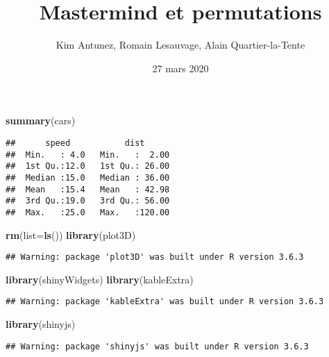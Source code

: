 \documentclass[]{article}
\title{Mastermind et permutations}
\author{Kim Antunez, Romain Lesauvage, Alain Quartier-la-Tente}
\date{27 mars 2020}
\newenvironment{Shaded}{\begin{snugshade}}{\end{snugshade}}
\newcommand{\DataTypeTok}[1]{\textcolor[rgb]{0.13,0.29,0.53}{#1}}
\newcommand{\KeywordTok}[1]{\textcolor[rgb]{0.13,0.29,0.53}{\textbf{#1}}}
\newcommand{\NormalTok}[1]{#1}
\begin{document}
\maketitle

\begin{Shaded}
\begin{Highlighting}[]
\KeywordTok{summary}\NormalTok{(cars)}
\end{Highlighting}
\end{Shaded}

\begin{verbatim}
##      speed           dist       
##  Min.   : 4.0   Min.   :  2.00  
##  1st Qu.:12.0   1st Qu.: 26.00  
##  Median :15.0   Median : 36.00  
##  Mean   :15.4   Mean   : 42.98  
##  3rd Qu.:19.0   3rd Qu.: 56.00  
##  Max.   :25.0   Max.   :120.00
\end{verbatim}

\begin{Shaded}
\begin{Highlighting}[]
\KeywordTok{rm}\NormalTok{(}\DataTypeTok{list=}\KeywordTok{ls}\NormalTok{())}
\KeywordTok{library}\NormalTok{(plot3D)}
\end{Highlighting}
\end{Shaded}

\begin{verbatim}
## Warning: package 'plot3D' was built under R version 3.6.3
\end{verbatim}

\begin{Shaded}
\begin{Highlighting}[]
\KeywordTok{library}\NormalTok{(shinyWidgets)}
\KeywordTok{library}\NormalTok{(kableExtra)}
\end{Highlighting}
\end{Shaded}

\begin{verbatim}
## Warning: package 'kableExtra' was built under R version 3.6.3
\end{verbatim}

\begin{Shaded}
\begin{Highlighting}[]
\KeywordTok{library}\NormalTok{(shinyjs)}
\end{Highlighting}
\end{Shaded}

\begin{verbatim}
## Warning: package 'shinyjs' was built under R version 3.6.3
\end{verbatim}
\end{document}
